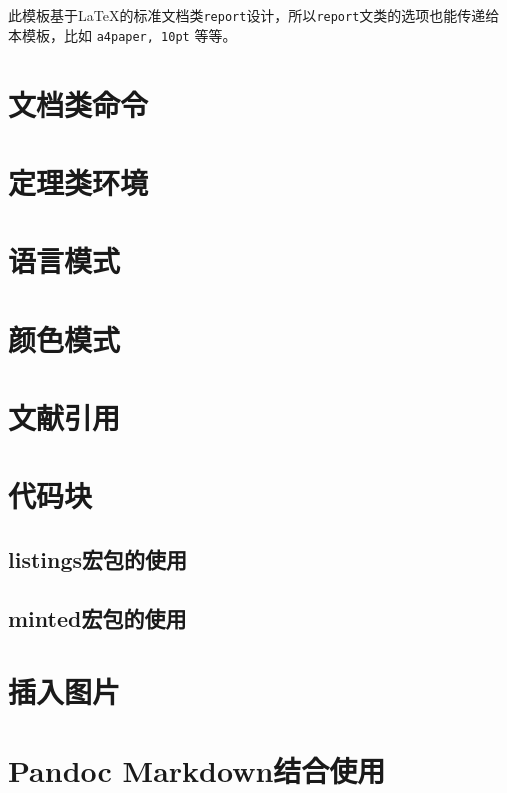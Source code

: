 \documentclass[12pt, green]{uglyrep}
\begin{document}
此模板基于\LaTeX{}的标准文档类\texttt{report}设计，所以\texttt{report}文类的选项也能传递给本模板，比如 \texttt{a4paper, 10pt} 等等。



\section{文档类命令}


\section{定理类环境}


\section{语言模式}


\section{颜色模式}\label{ssec:colors}


\section{文献引用}


\section{代码块}


\subsection{listings宏包的使用}

\subsection{minted宏包的使用}


\section{插入图片}


\section{Pandoc Markdown结合使用}
\end{document}
